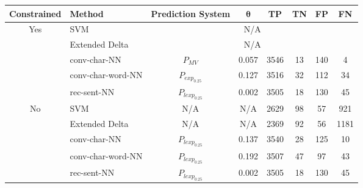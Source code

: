 \begin{adjustbox}{center}
\begin{tabular}{|c|l|c|c|c|c|c|c|}
\hline
    \textbf{Constrained} & \textbf{Method} & \textbf{Prediction System} & $\mathbf{\theta}$ & \textbf{TP} & \textbf{TN} & \textbf{FP} & \textbf{FN} \\ \hline
    \multirow{5}{*}{Yes} & \gls{SVM} & \multicolumn{6}{c|}{N/A} \\ \cline{2-8}
    & Extended Delta & \multicolumn{6}{c|}{N/A} \\ \cline{2-8}
    & \gls{conv-char-NN} & $P_{MV}$ & 0.057 & 3546 & 13  & 140 & 4 \\ \cline{2-8}
    & \gls{conv-char-word-NN} & $P_{exp_{0.25}}$ & 0.127 & 3516 & 32  & 112 & 34 \\ \cline{2-8}
    & \gls{rec-sent-NN} & $P_{lexp_{0.25}}$ & 0.002 & 3505 & 18  & 130 & 45 \\ \hline\hline
    \multirow{5}{*}{No} & \gls{SVM} & N/A & N/A & 2629 & 98  & 57  & 921 \\ \cline{2-8}
    & Extended Delta & N/A & N/A & 2369 & 92  & 56  & 1181 \\ \cline{2-8}
    & \gls{conv-char-NN} & $P_{lexp_{0.25}}$ & 0.137 & 3540 & 28  & 125 & 10 \\ \cline{2-8}
    & \gls{conv-char-word-NN} & $P_{lexp_{0.25}}$ & 0.192 & 3507 & 47  & 97  & 43 \\ \cline{2-8}
    & \gls{rec-sent-NN} & $P_{lexp_{0.25}}$ & 0.002 & 3505 & 18  & 130 & 45 \\ \hline
\end{tabular}
\end{adjustbox}
